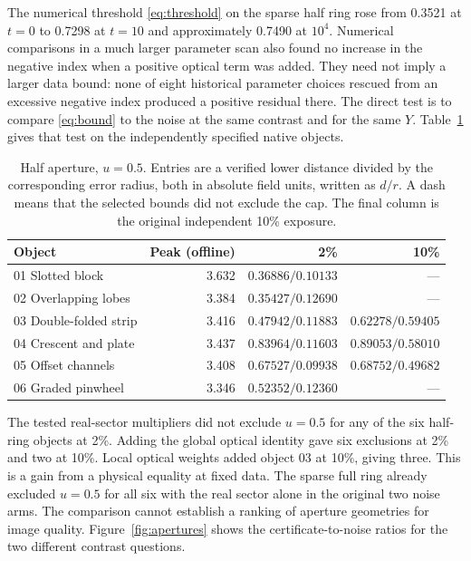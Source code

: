 \documentclass[anonymous,12pt]{iopjournal}
\theoremstyle{remark}\newtheorem{remark}[theorem]{Remark}
\numberwithin{equation}{section}
\begin{document}
The numerical threshold \eqref{eq:threshold} on the sparse half ring rose from 0.3521 at $t=0$ to 0.7298 at $t=10$ and approximately 0.7490 at $10^4$. Numerical comparisons in a much larger parameter scan also found no increase in the negative index when a positive optical term was added. They need not imply a larger data bound: none of eight historical parameter choices rescued from an excessive negative index produced a positive residual there. The direct test is to compare \eqref{eq:bound} to the noise at the same contrast and for the same $Y$. Table~\ref{tab:half} gives that test on the independently specified native objects.

\begin{table}[tb]
\caption{Half aperture, $u=0.5$. Entries are a verified lower distance divided by the corresponding error radius, both in absolute field units, written as $d/r$. A dash means that the selected bounds did not exclude the cap. The final column is the original independent 10\% exposure.}\label{tab:half}
\centering\begin{tabular}{lrrr}\toprule
Object & Peak (offline) & 2\% & 10\% \\ \midrule
01 Slotted block &3.632& $0.36886/0.10133$ & ---\\
02 Overlapping lobes &3.384& $0.35427/0.12690$ & ---\\
03 Double-folded strip &3.416& $0.47942/0.11883$ & $0.62278/0.59405$\\
04 Crescent and plate &3.437& $0.83964/0.11603$ & $0.89053/0.58010$\\
05 Offset channels &3.408& $0.67527/0.09938$ & $0.68752/0.49682$\\
06 Graded pinwheel &3.346& $0.52352/0.12360$ & ---\\ \bottomrule
\end{tabular}
\end{table}

The tested real-sector multipliers did not exclude $u=0.5$ for any of the six half-ring objects at 2\%. Adding the global optical identity gave six exclusions at 2\% and two at 10\%. Local optical weights added object 03 at 10\%, giving three. This is a gain from a physical equality at fixed data. The sparse full ring already excluded $u=0.5$ for all six with the real sector alone in the original two noise arms. The comparison cannot establish a ranking of aperture geometries for image quality. Figure~\ref{fig:apertures} shows the certificate-to-noise ratios for the two different contrast questions.
\end{document}
